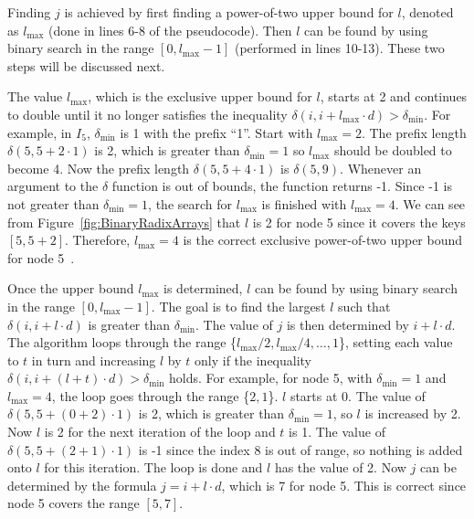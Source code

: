 \documentclass{sig-alternate}
\begin{document}
Finding $j$ is achieved by first finding a power-of-two upper bound for $l$, denoted as $l_{\textrm{max}}$ (done in lines 6-8 of the pseudocode). Then $l$ can be found by using binary search in the range $[0,l_{\textrm{max}}-1]$ (performed in lines 10-13). These two steps will be discussed next.

The value $l_{\textrm{max}}$, which is the exclusive upper bound for $l$, starts at 2 and continues to double until it no longer satisfies the inequality $\delta(i,i+l_{\textrm{max}} \cdot d)>\delta_{\textrm{min}}$. For example, in $I_5$, $\delta_{\textrm{min}}$ is 1 with the prefix ``1''. Start with $l_{\textrm{max}}=2$. The prefix length $\delta(5, 5+2 \cdot 1)$ is 2, which is greater than $\delta_{\textrm{min}}=1$ so $l_{\textrm{max}}$ should be doubled to become 4. Now the prefix length $\delta(5, 5+4 \cdot 1)$ is $\delta(5,9)$. Whenever an argument to the $\delta$ function is out of bounds, the function returns -1. Since -1 is not greater than $\delta_{\textrm{min}}=1$, the search for $l_{\textrm{max}}$ is finished with $l_{\textrm{max}}=4$. We can see from Figure~\ref{fig:BinaryRadixArrays} that $l$ is 2 for node 5 since it covers the keys $[5,5+2]$. Therefore, $l_{\textrm{max}}=4$ is the correct exclusive power-of-two upper bound for node 5~\cite{Karras:2012}.

Once the upper bound $l_{\textrm{max}}$ is determined, $l$ can be found by using binary search in the range $[0,l_{\textrm{max}}-1]$. The goal is to find the largest $l$ such that $\delta(i,i+l \cdot d)$ is greater than $\delta_{\textrm{min}}$. The value of $j$ is then determined by $i+l \cdot d$.
The algorithm loops through the range \{$l_{\textrm{max}}/2, l_{\textrm{max}}/4,\dots, 1$\}, setting each value to $t$ in turn and increasing $l$ by $t$ only if the inequality $\delta(i,i+(l+t) \cdot d)>\delta_{\textrm{min}}$ holds. For example, for node 5, with $\delta_{\textrm{min}}=1$ and $l_{\textrm{max}}=4$, the loop goes through the range \{$2, 1$\}. $l$ starts at 0. The value of $\delta(5, 5+(0+2) \cdot 1)$ is 2, which is greater than $\delta_{\textrm{min}}=1$, so $l$ is increased by 2. Now $l$ is 2 for the next iteration of the loop and $t$ is 1. The value of $\delta(5, 5+(2+1) \cdot 1)$ is -1 since the index 8 is out of range, so nothing is added onto $l$ for this iteration. The loop is done and $l$ has the value of 2. Now $j$ can be determined by the formula $j=i+l \cdot d$, which is 7 for node 5. This is correct since node 5 covers the range $[5, 7]$.
\end{document}
